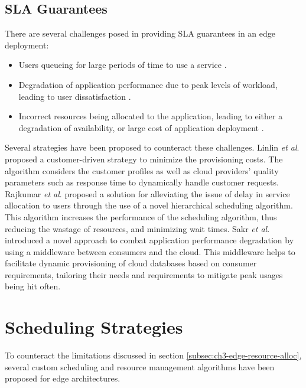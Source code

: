 \subsection{SLA Guarantees}
\label{subsec:ch3-sla-edge}

There are several challenges posed in providing SLA guarantees in an edge deployment:
\begin{itemize}
    \item Users queueing for large periods of time to use a service \cite{venticinque2011cloud}.
    \item Degradation of application performance due to peak levels of workload, leading to user dissatisfaction \cite{sakr2012sla}.
    \item Incorrect resources being allocated to the application, leading to either a degradation of availability, or large cost of application deployment \cite{houlihan2014auditing}.
\end{itemize}

Several strategies have been proposed to counteract these challenges. Linlin \textit{et al}. \cite{wu2013sla} proposed a customer-driven strategy  to minimize the provisioning costs. The algorithm considers the customer profiles as well as cloud providers' quality parameters such as response time to dynamically handle customer requests. Rajkumar \textit{et al}. \cite{rajavel2012achieving} proposed a solution for alleviating the issue of delay in service allocation to users through the use of a novel hierarchical scheduling algorithm. This algorithm increases the performance of the scheduling algorithm, thus reducing the wastage of resources, and minimizing wait times. Sakr \textit{et al}. \cite{sakr2012sla} introduced a novel approach to combat application performance degradation by using a middleware between consumers and the cloud. This middleware helps to facilitate dynamic provisioning of cloud databases based on consumer requirements, tailoring their needs and requirements to mitigate peak usages being hit often.

\section{Scheduling Strategies}
\label{sec:ch3-resource-schedule-solutions}

To counteract the limitations discussed in section \ref{subsec:ch3-edge-resource-alloc}, several custom scheduling and resource management algorithms have been proposed for edge architectures.\par

